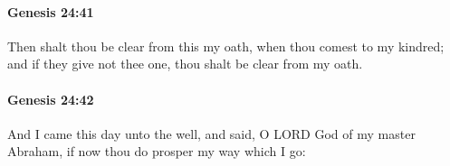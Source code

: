 		\paragraph{Genesis 24:41} %
			\label{GENESIS-24-41}

			Then shalt thou be clear from this my oath, when thou comest to my kindred; and if they give not thee one, thou shalt be clear from my oath.


		\paragraph{Genesis 24:42} %
			\label{GENESIS-24-42}

			And I came this day unto the well, and said, O LORD God of my master Abraham, if now thou do prosper my way which I go:


